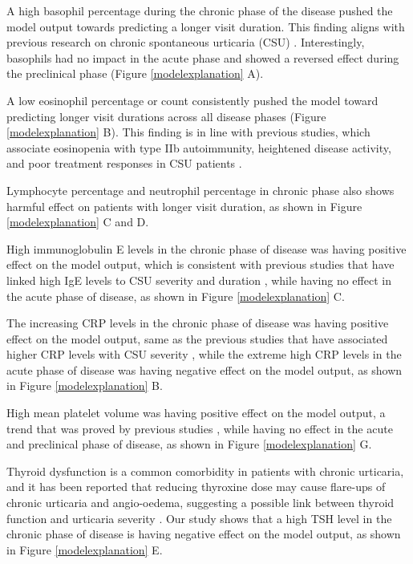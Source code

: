 \documentclass[final,3p,times,authoryear]{elsarticle}
\begin{document}
A high basophil percentage during the chronic phase of the disease pushed the model output towards predicting a longer visit duration. This finding aligns with previous research on chronic spontaneous urticaria (CSU) \citep{SanchezBorges2017Factors}. Interestingly, basophils had no impact in the acute phase and showed a reversed effect during the preclinical phase (Figure \ref{modelexplanation} A). 

A low eosinophil percentage or count consistently pushed the model toward predicting longer visit durations across all disease phases (Figure \ref{modelexplanation} B). This finding is in line with previous studies, which associate eosinopenia with type IIb autoimmunity, heightened disease activity, and poor treatment responses in CSU patients \citep{Kolkhir2019Eosinopenia}.

Lymphocyte percentage and neutrophil percentage in chronic phase also shows harmful effect on patients with longer visit duration, as shown in Figure \ref{modelexplanation} C and D.


High immunoglobulin E levels in the chronic phase of disease was having positive effect on the model output, which is consistent with previous studies that have linked high IgE levels to CSU severity and duration \citep{SanchezBorges2017Factors}, while having no effect in the acute phase of disease, as shown in Figure \ref{modelexplanation} C.

The increasing CRP levels in the chronic phase of disease was having positive effect on the model output, same as the previous studies that have associated higher CRP levels with CSU severity \citep{Rabelo-Filardi2013Parameters}, while the extreme high CRP levels in the acute phase of disease was having negative effect on the model output, as shown in Figure \ref{modelexplanation} B. 

High mean platelet volume was having positive effect on the model output, a trend that was proved by previous studies \citep{Aleem2015Correlation, Magen2010Increased}, while having no effect in the acute and preclinical phase of disease, as shown in Figure \ref{modelexplanation} G.

Thyroid dysfunction is a common comorbidity in patients with chronic urticaria, and it has been reported that reducing thyroxine dose may cause flare-ups of chronic urticaria and angio-oedema, suggesting a possible link between thyroid function and urticaria severity \citep{Dunkley2003Thyroid}. Our study shows that a high TSH level in the chronic phase of disease is having negative effect on the model output, as shown in Figure \ref{modelexplanation} E.
\end{document}
